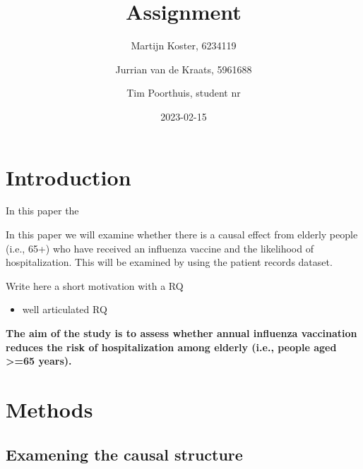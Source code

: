 \documentclass[
]{article}
\title{Assignment}
\author{Martijn Koster, 6234119 \and Jurrian van de Kraats, 5961688 \and Tim Poorthuis, student nr}
\date{2023-02-15}
\providecommand{\tightlist}{%
  \setlength{\itemsep}{0pt}\setlength{\parskip}{0pt}}
\begin{document}
\maketitle

\newpage

\hypertarget{introduction}{%
\section{Introduction}\label{introduction}}

In this paper the

In this paper we will examine whether there is a causal effect from elderly people (i.e., 65+) who have received an influenza vaccine and the likelihood of hospitalization. This will be examined by using the patient records dataset.

Write here a short motivation with a RQ

\begin{itemize}
\tightlist
\item
  well articulated RQ
\end{itemize}

\textbf{The aim of the study is to assess whether annual influenza vaccination reduces the risk of hospitalization among elderly (i.e., people aged \textgreater=65 years).}

\hypertarget{methods}{%
\section{Methods}\label{methods}}

\hypertarget{examening-the-causal-structure}{%
\subsection{Examening the causal structure}\label{examening-the-causal-structure}}
\end{document}
